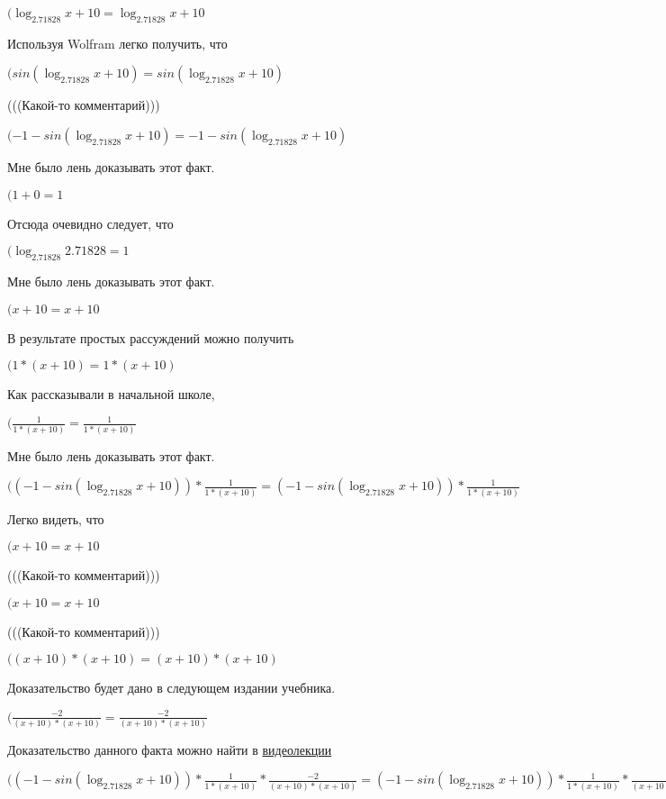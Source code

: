 \documentclass[12pt,a4paper,fleqn]{article}
\theoremstyle{definition}
\begin{document}
$(\log_{ 2.71828 }{ x  +  10 } = \log_{ 2.71828 }{ x  +  10 }$

Используя Wolfram легко получить, что

$(sin(\log_{ 2.71828 }{ x  +  10 }) = sin(\log_{ 2.71828 }{ x  +  10 })$

(((Какой-то комментарий)))

$( -1  - sin(\log_{ 2.71828 }{ x  +  10 }) =  -1  - sin(\log_{ 2.71828 }{ x  +  10 })$

Мне было лень доказывать этот факт.

$( 1  +  0  =  1 $

Отсюда очевидно следует, что

$(\log_{ 2.71828 }{ 2.71828 } =  1 $

Мне было лень доказывать этот факт.

$( x  +  10  =  x  +  10 $

В результате простых рассуждений можно получить

$( 1  * ( x  +  10 ) =  1  * ( x  +  10 )$

Как рассказывали в начальной школе,

$(\frac{ 1 }{ 1  * ( x  +  10 )}
 = \frac{ 1 }{ 1  * ( x  +  10 )}
$

Мне было лень доказывать этот факт.

$(( -1  - sin(\log_{ 2.71828 }{ x  +  10 })) * \frac{ 1 }{ 1  * ( x  +  10 )}
 = ( -1  - sin(\log_{ 2.71828 }{ x  +  10 })) * \frac{ 1 }{ 1  * ( x  +  10 )}
$

Легко видеть, что

$( x  +  10  =  x  +  10 $

(((Какой-то комментарий)))

$( x  +  10  =  x  +  10 $

(((Какой-то комментарий)))

$(( x  +  10 ) * ( x  +  10 ) = ( x  +  10 ) * ( x  +  10 )$

Доказательство будет дано в следующем издании учебника.

$(\frac{ -2 }{( x  +  10 ) * ( x  +  10 )}
 = \frac{ -2 }{( x  +  10 ) * ( x  +  10 )}
$

Доказательство данного факта можно найти в \href{https://www.youtube.com/watch?v=dQw4w9WgXcQ}{видеолекции}

$(( -1  - sin(\log_{ 2.71828 }{ x  +  10 })) * \frac{ 1 }{ 1  * ( x  +  10 )}
 * \frac{ -2 }{( x  +  10 ) * ( x  +  10 )}
 = ( -1  - sin(\log_{ 2.71828 }{ x  +  10 })) * \frac{ 1 }{ 1  * ( x  +  10 )}
 * \frac{ -2 }{( x  +  10 ) * ( x  +  10 )}
$
\end{document}
